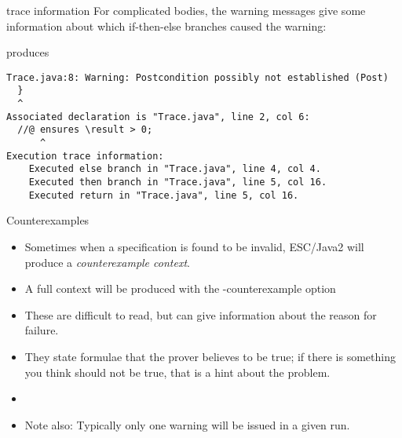 \documentclass[
pdf,
nocolorBG,
slideColor,
cok,
]{prosper}
\newcommand{\bsl}{\char'134}
\newcommand{\result}{\bsl result}
\begin{document}
\begin{slide}{trace information}
\vspace*{-9ex}
For complicated bodies, the warning messages give some information about which
if-then-else branches caused the warning:
\begin{figure*}
\tiny

\end{figure*}
\vspace*{-2ex}
produces
\tiny
\begin{verbatim}
Trace.java:8: Warning: Postcondition possibly not established (Post)
  }
  ^
Associated declaration is "Trace.java", line 2, col 6:
  //@ ensures \result > 0;
      ^
Execution trace information:
    Executed else branch in "Trace.java", line 4, col 4.
    Executed then branch in "Trace.java", line 5, col 16.
    Executed return in "Trace.java", line 5, col 16.
\end{verbatim}
\end{slide}

\begin{slide}{Counterexamples}
\vspace*{-6ex}
\begin{itemize}
\item Sometimes when a specification is found to be invalid, ESC/Java2 will produce a 
\textit{counterexample context}.
\item A full context will be produced with the {\knalblue -counterexample} option
\item These are difficult to read, but can give information about the reason for failure.
\item They state formulae that the prover believes to be true; if there is something you think should
not be true, that is a hint about the problem.
\item[]
\item Note also: Typically only one warning will be issued in a given run.
\end{itemize}
\end{slide}

\end{document}
